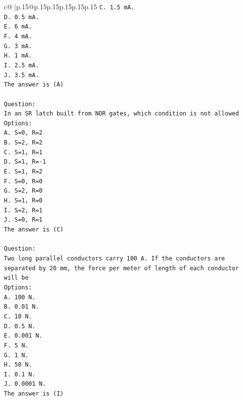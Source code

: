 \documentclass{article}
\begin{document}
{\begin{supertabular}{c@{$\;$}|p{.15\linewidth}@{}p{.15\linewidth}p{.15\linewidth}p{.15\linewidth}p{.15\linewidth}p{.15\linewidth}}
{{{\texttt{C. 1.5 mA.} \\
\texttt{D. 0.5 mA.} \\
\texttt{E. 6 mA.} \\
\texttt{F. 4 mA.} \\
\texttt{G. 3 mA.} \\
\texttt{H. 1 mA.} \\
\texttt{I. 2.5 mA.} \\
\texttt{J. 3.5 mA.} \\
\texttt{The answer is (A)} \\
\\ 
\texttt{Question:} \\
\texttt{In an SR latch built from NOR gates, which condition is not allowed} \\
\texttt{Options:} \\
\texttt{A. S=0, R=2} \\
\texttt{B. S=2, R=2} \\
\texttt{C. S=1, R=1} \\
\texttt{D. S=1, R={-}1} \\
\texttt{E. S=1, R=2} \\
\texttt{F. S=0, R=0} \\
\texttt{G. S=2, R=0} \\
\texttt{H. S=1, R=0} \\
\texttt{I. S=2, R=1} \\
\texttt{J. S=0, R=1} \\
\texttt{The answer is (C)} \\
\\ 
\texttt{Question:} \\
\texttt{Two long parallel conductors carry 100 A. If the conductors are separated by 20 mm, the force per meter of length of each conductor will be} \\
\texttt{Options:} \\
\texttt{A. 100 N.} \\
\texttt{B. 0.01 N.} \\
\texttt{C. 10 N.} \\
\texttt{D. 0.5 N.} \\
\texttt{E. 0.001 N.} \\
\texttt{F. 5 N.} \\
\texttt{G. 1 N.} \\
\texttt{H. 50 N.} \\
\texttt{I. 0.1 N.} \\
\texttt{J. 0.0001 N.} \\
\texttt{The answer is (I)} \\
}}}
\end{supertabular}}
\end{document}
